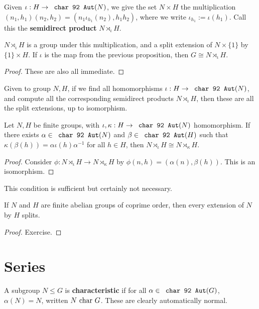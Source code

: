 \documentclass{article}
\begin{document}
\begin{definition}
    Given $\iota:H\rightarrow \Aut(N)$, we give the set $N\times H$ the multiplication $(n_1,h_1)(n_2,h_2) = (n_1\iota_{h_1}(n_2),h_1h_2)$, where we write $\iota_{h_1}:=\iota(h_1)$. Call this the \textbf{semidirect product} $N \rtimes_\iota H$.
\end{definition}

\begin{proposition}
    $N\rtimes_\iota H$ is a group under this multiplication, and a split extension of $N\times\{1\}$ by $\{1\}\times H$. If $\iota$ is the map from the previous proposition, then $G\cong N \rtimes_\iota H$.
    \begin{proof}
        These are also all immediate.
    \end{proof}
\end{proposition}

Given to group $N,H$, if we find all homomorphisms $\iota:H\rightarrow \Aut(N)$, and compute all the corresponding semidirect products $N\rtimes_\iota H$, then these are all the split extensions, up to isomorphism.

\begin{proposition}
    Let $N,H$ be finite groups, with $\iota,\kappa:H\rightarrow \Aut(N)$ homomorphism. If there exists $\alpha \in \Aut(N)$ and $\beta \in \Aut(H)$ such that $\kappa(\beta(h))=\alpha\iota(h)\alpha^{-1}$ for all $h\in H$, then $N\rtimes_\iota H \cong N\rtimes_\kappa H$.\begin{proof}
        Consider $\phi:N\rtimes_\iota H \rightarrow N \rtimes_\kappa H$ by $\phi(n,h)=(\alpha(n),\beta(h))$. This is an isomorphism.
    \end{proof}
\end{proposition}

This condition is sufficient but certainly not necessary.

\begin{proposition}
    If $N$ and $H$ are finite abelian groups of coprime order, then every extension of $N$ by $H$ splits.
    \begin{proof}
        Exercise.
    \end{proof}
\end{proposition}

\section{Series}

\begin{definition}
    A subgroup $N\leq G$ is \textbf{characteristic} if for all $\alpha \in \Aut(G)$, $\alpha(N)=N$, written $N\text{ char } G$. These are clearly automatically normal.
\end{definition}
\end{document}
